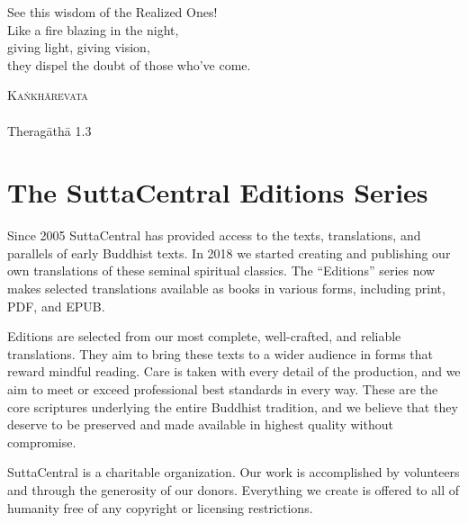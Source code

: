 \documentclass[12pt,openany]{book}%
\newcommand{\blankpage}{
\newpage
\thispagestyle{empty}
\mbox{}
\newpage
}
\newcommand*{\epigraphTranslatedTitle}[1]{\vspace*{.5em}\footnotesize\textsc{#1}\\}%
\newcommand*{\epigraphRootTitle}[1]{\footnotesize\textit{#1}\\}%
\newcommand*{\epigraphReference}[1]{\footnotesize{#1}}%
\begin{document}
\newpage

\setlength{\parindent}{1.5em}%
\newpage

\vspace*{\fill}

\begin{center}
\epigraph{See this wisdom of the Realized Ones!\\
Like a fire blazing in the night,\\
giving light, giving vision,\\
they dispel the doubt of those who’ve come.}
{
\epigraphTranslatedTitle{\textsanskrit{Kaṅkhārevata}}
\epigraphRootTitle{}
\epigraphReference{\textsanskrit{Theragāthā} 1.3}
}
\end{center}

\vspace*{2in}

\vspace*{\fill}

\blankpage%

\setlength{\parindent}{1em}
%
\tableofcontents
\newpage
\pagestyle{fancy}
%
\chapter*{The SuttaCentral Editions Series}

Since 2005 SuttaCentral has provided access to the texts, translations, and parallels of early Buddhist texts. In 2018 we started creating and publishing our own translations of these seminal spiritual classics. The “Editions” series now makes selected translations available as books in various forms, including print, PDF, and EPUB.

Editions are selected from our most complete, well-crafted, and reliable translations. They aim to bring these texts to a wider audience in forms that reward mindful reading. Care is taken with every detail of the production, and we aim to meet or exceed professional best standards in every way. These are the core scriptures underlying the entire Buddhist tradition, and we believe that they deserve to be preserved and made available in highest quality without compromise.

SuttaCentral is a charitable organization. Our work is accomplished by volunteers and through the generosity of our donors. Everything we create is offered to all of humanity free of any copyright or licensing restrictions. 
\end{document}
